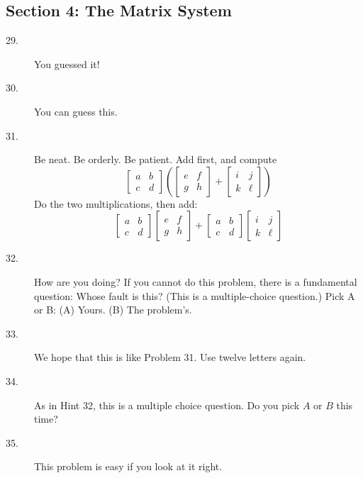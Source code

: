 \documentclass{article}
\begin{document}
\subsection*{Section 4: The Matrix System}

\begin{description}

  \item[29.] You guessed it! 

  \item[30.] You can guess this. 

  \item[31.] Be neat. Be orderly. Be patient. Add first, and compute
    \begin{equation*}
      \begin{bmatrix} a & b \\ c & d \end{bmatrix}
      \left( \begin{bmatrix} e & f \\ g & h \end{bmatrix} 
      + \begin{bmatrix} i & j \\ k & \ell \end{bmatrix} \right)
    \end{equation*}
    Do the two multiplications, then add:
    \begin{equation*}
      \begin{bmatrix} a & b \\ c & d \end{bmatrix}
      \begin{bmatrix} e & f \\ g & h \end{bmatrix} +
      \begin{bmatrix} a & b \\ c & d \end{bmatrix}
      \begin{bmatrix} i & j \\ k & \ell \end{bmatrix}
    \end{equation*}

  \item[32.] How are you doing? If you cannot do this problem, there is a fundamental question: Whose fault is this? (This is a multiple-choice question.) Pick A or B: (A) Yours. (B) The problem's.

  \item[33.] We hope that this is like Problem 31. Use twelve letters again. 

  \item[34.] As in Hint 32, this is a multiple choice question. Do you pick $A$ or $B$ this time? 

  \item[35.] This problem is easy if you look at it right.

\end{description}
\end{document}
